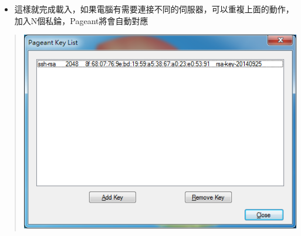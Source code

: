 \documentclass[letterpaper,10pt,english]{sphinxmanual}
\begin{document}
\begin{itemize}
\item {} 
這樣就完成載入，如果電腦有需要連接不同的伺服器，可以重複上面的動作，加入N個私錀，Pageant將會自動對應

\end{itemize}
\begin{quote}

\includegraphics{pageant-005.png}
\end{quote}
\end{document}
